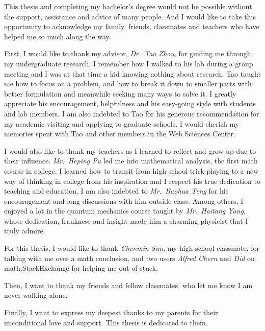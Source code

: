 
This thesis and completing my bachelor's degree would not be possible without the support, assistance and advice of many people. And I would like to take this opportunity to acknowledge my family, friends, classmates and teachers who have helped me so much along the way.

First, I would like to thank my advisor, \textit{Dr.~Tao Zhou}, for guiding me through my undergraduate research. I remember how I walked to his lab during a group meeting and I was at that time a kid knowing nothing about research. Tao taught me how to focus on a problem, and how to break it down to smaller parts with better formulation and meanwhile seeking many ways to solve it. I greatly appreciate his encouragement, helpfulness and his easy-going style with students and lab members. I am also indebted to Tao for his generous recommendation for my academic visiting and applying to graduate schools. I would cherish my memories spent with Tao and other members in the Web Sciences Center.

I would also like to thank my teachers as I learned to reflect and grow up due to their influence. \textit{Mr.~Heping Pu} led me into mathematical analysis, the first math course in college. I learned how to transit from high school trick-playing to a new way of thinking in college from his inspiration and I respect his true dedication to teaching and education. I am also indebted to \textit{Mr.~Baohua Teng} for his encouragement and long discussions with him outside class. Among others, I enjoyed a lot in the quantum mechanics course taught by \textit{Mr.~Haitang Yang}, whose dedication, frankness and insight made him a charming physicist that I truly admire. 

For this thesis, I would like to thank \textit{Chenmin Sun}, my high school classmate, for talking with me over a math conclusion, and two users \textit{Alfred Chern} and \textit{Did} on math.StackExchange for helping me out of stuck. 

Then, I want to thank my friends and fellow classmates, who let me know I am never walking alone. 

Finally, I want to express my deepest thanks to my parents for their unconditional love and support. This thesis is dedicated to them. 
